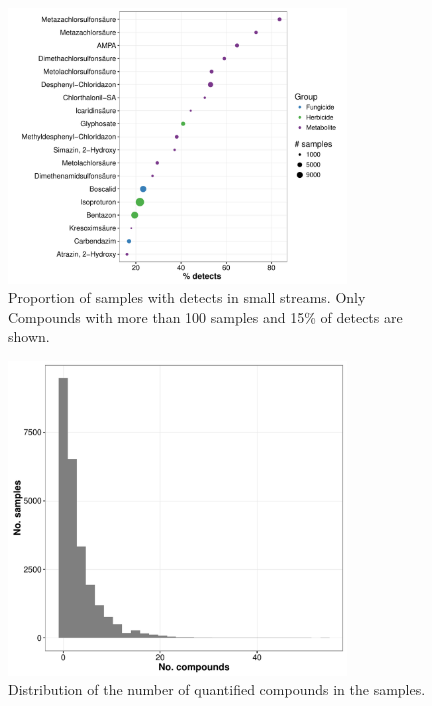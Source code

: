 \documentclass[pdftex,
	a4paper,
	titlepage=false]{scrreprt}
\begin{document}
\begin{figure}[ht]
	\centering
	\includegraphics[width = 0.8\textwidth]{pdetects}
	\caption[Proportion of samples with detects in small streams.]{Proportion of samples with detects in small streams. Only Compounds with more than 100 samples and 15\% of detects are shown.}
	\label{fig:pdetects}
\end{figure}

\begin{figure}[ht]
	\centering
	\includegraphics[width = 0.8\textwidth]{pmix}
	\caption{Distribution of the number of quantified compounds in the samples.}
	\label{fig:pmix}
\end{figure}


% 
\end{document}
